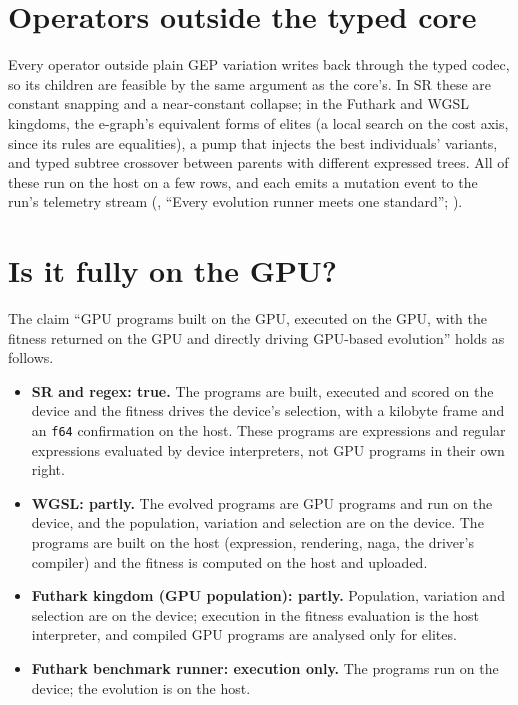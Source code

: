 \documentclass[11pt,a4paper]{report}
\newcommand{\src}[1]{{\footnotesize\path{#1}}}
\begin{document}
\section{Operators outside the typed core}
Every operator outside plain GEP variation writes back through the typed codec, so
its children are feasible by the same argument as the core's. In SR these are
constant snapping and a near-constant collapse; in the Futhark and WGSL kingdoms,
the e-graph's equivalent forms of elites (a local search on the cost axis, since
its rules are equalities), a pump that injects the best individuals' variants, and
typed subtree crossover between parents with different expressed trees. All of
these run on the host on a few rows, and each emits a mutation event to the run's
telemetry stream (\src{fuller/CLAUDE.md}, ``Every evolution runner meets one
standard''; \src{phylu/docs/WATCHER.md}).

\section{Is it fully on the GPU?}
The claim ``GPU programs built on the GPU, executed on the GPU, with the fitness
returned on the GPU and directly driving GPU-based evolution'' holds as follows.
\begin{itemize}
\item \textbf{SR and regex: true.} The programs are built, executed and scored on
the device and the fitness drives the device's selection, with a kilobyte frame
and an \texttt{f64} confirmation on the host. These programs are expressions and
regular expressions evaluated by device interpreters, not GPU programs in their
own right.
\item \textbf{WGSL: partly.} The evolved programs are GPU programs and run on the
device, and the population, variation and selection are on the device. The
programs are built on the host (expression, rendering, naga, the driver's
compiler) and the fitness is computed on the host and uploaded.
\item \textbf{Futhark kingdom (GPU population): partly.} Population,
variation and selection are on the device; execution in the fitness evaluation
is the host interpreter, and compiled GPU programs are analysed only for elites.
\item \textbf{Futhark benchmark runner: execution only.} The programs run on the
device; the evolution is on the host.
\end{itemize}

\end{document}
